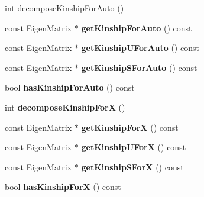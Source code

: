 \begin{DoxyCompactItemize}
\item 
int \hyperlink{classDataConsolidator_a296e1c33fcf7dc936de8c3c8d269aa27}{decompose\-Kinship\-For\-Auto} ()
\item 
\hypertarget{classDataConsolidator_a5f408a66bc96c5c35b46c8e037b577a4}{const Eigen\-Matrix $\ast$ {\bfseries get\-Kinship\-For\-Auto} () const }\label{classDataConsolidator_a5f408a66bc96c5c35b46c8e037b577a4}

\item 
\hypertarget{classDataConsolidator_a96264603901b05e5db06bf521e05eceb}{const Eigen\-Matrix $\ast$ {\bfseries get\-Kinship\-U\-For\-Auto} () const }\label{classDataConsolidator_a96264603901b05e5db06bf521e05eceb}

\item 
\hypertarget{classDataConsolidator_a70018150cef6a5b0286bd82104b58504}{const Eigen\-Matrix $\ast$ {\bfseries get\-Kinship\-S\-For\-Auto} () const }\label{classDataConsolidator_a70018150cef6a5b0286bd82104b58504}

\item 
\hypertarget{classDataConsolidator_ab8fc9035c1c59e9dcdaac3e1fdad15e1}{bool {\bfseries has\-Kinship\-For\-Auto} () const }\label{classDataConsolidator_ab8fc9035c1c59e9dcdaac3e1fdad15e1}

\item 
\hypertarget{classDataConsolidator_a9217cca4e2d6db91849e5b1f6cb85f7d}{int {\bfseries decompose\-Kinship\-For\-X} ()}\label{classDataConsolidator_a9217cca4e2d6db91849e5b1f6cb85f7d}

\item 
\hypertarget{classDataConsolidator_a3ad74745814e28455f21d68d9a972efe}{const Eigen\-Matrix $\ast$ {\bfseries get\-Kinship\-For\-X} () const }\label{classDataConsolidator_a3ad74745814e28455f21d68d9a972efe}

\item 
\hypertarget{classDataConsolidator_a92169c65d5e960b15f21030da2efba43}{const Eigen\-Matrix $\ast$ {\bfseries get\-Kinship\-U\-For\-X} () const }\label{classDataConsolidator_a92169c65d5e960b15f21030da2efba43}

\item 
\hypertarget{classDataConsolidator_a5c3335f177f0f9bca35199707762e43e}{const Eigen\-Matrix $\ast$ {\bfseries get\-Kinship\-S\-For\-X} () const }\label{classDataConsolidator_a5c3335f177f0f9bca35199707762e43e}

\item 
\hypertarget{classDataConsolidator_a19bf9e104900fb727863db0a1ac86406}{bool {\bfseries has\-Kinship\-For\-X} () const }\label{classDataConsolidator_a19bf9e104900fb727863db0a1ac86406}


\end{DoxyCompactItemize}
